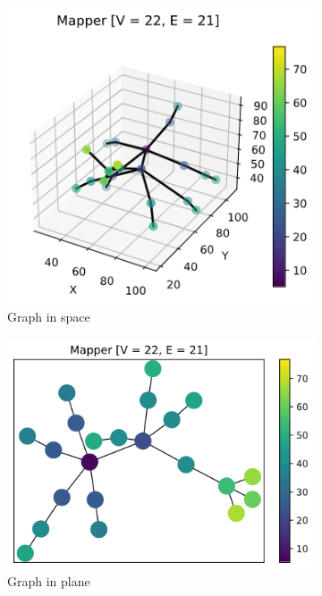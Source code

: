 \documentclass{article}
\begin{document}
\begin{figure}[ht]
\begin{subfigure}[c]{0.3\columnwidth}
        \includegraphics[width=\textwidth]{ant-graph-3d}
        \caption{Graph in space}
        \label{fig:ant-space}
    \end{subfigure}
    \begin{subfigure}[c]{0.3\columnwidth}
        \centering
        \includegraphics[width=\textwidth]{ant-graph-2d}
        \caption{Graph in plane}
        \label{fig:ant-plane}
    \end{subfigure}
    \begin{subfigure}[c]{0.9\columnwidth}

\end{subfigure}
\end{figure}
\end{document}
